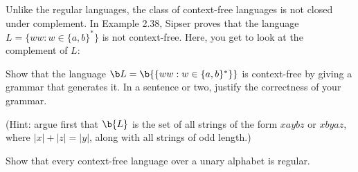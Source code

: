 \documentclass[letterpaper, ps]{cs121}
\begin{document}
Unlike the regular languages, the class of context-free languages
is not closed under complement.  In Example 2.38, Sipser proves that
the language $L = \{ww: w\in\{a,b\}^*\}$ is not context-free.  Here,
you get to look at the complement of $L$:

Show that the language $\b L = \b{\{ww: w\in\{a,b\}^*\}}$ is
context-free by giving a grammar that generates it.  In a sentence or two,
justify the correctness of your grammar.

(Hint: argue first that $\b{L}$ is the set of all strings of the form
$xaybz$ or $xbyaz$, where $|x|+|z|=|y|$, along with all strings of odd
length.)



Show that every context-free language over a unary alphabet is regular.

\end{document}
